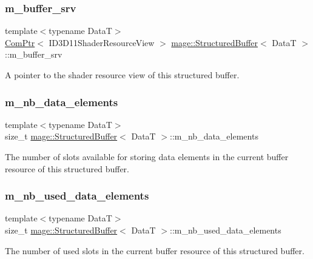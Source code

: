 \subsubsection{\texorpdfstring{m\+\_\+buffer\+\_\+srv}{m\_buffer\_srv}}
{\footnotesize\ttfamily template$<$typename DataT$>$ \\
\hyperlink{namespacemage_ae74f374780900893caa5555d1031fd79}{Com\+Ptr}$<$ I\+D3\+D11\+Shader\+Resource\+View $>$ \hyperlink{structmage_1_1_structured_buffer}{mage\+::\+Structured\+Buffer}$<$ DataT $>$\+::m\+\_\+buffer\+\_\+srv\hspace{0.3cm}{\ttfamily [private]}}

A pointer to the shader resource view of this structured buffer. \hypertarget{structmage_1_1_structured_buffer_a92c53203287f6ef5ab8ed88c7b588e72}{}\label{structmage_1_1_structured_buffer_a92c53203287f6ef5ab8ed88c7b588e72} 
\subsubsection{\texorpdfstring{m\+\_\+nb\+\_\+data\+\_\+elements}{m\_nb\_data\_elements}}
{\footnotesize\ttfamily template$<$typename DataT$>$ \\
size\+\_\+t \hyperlink{structmage_1_1_structured_buffer}{mage\+::\+Structured\+Buffer}$<$ DataT $>$\+::m\+\_\+nb\+\_\+data\+\_\+elements\hspace{0.3cm}{\ttfamily [private]}}

The number of slots available for storing data elements in the current buffer resource of this structured buffer. \hypertarget{structmage_1_1_structured_buffer_a8c69058d2ce956c7c1690a45e1bffb34}{}\label{structmage_1_1_structured_buffer_a8c69058d2ce956c7c1690a45e1bffb34} 
\subsubsection{\texorpdfstring{m\+\_\+nb\+\_\+used\+\_\+data\+\_\+elements}{m\_nb\_used\_data\_elements}}
{\footnotesize\ttfamily template$<$typename DataT$>$ \\
size\+\_\+t \hyperlink{structmage_1_1_structured_buffer}{mage\+::\+Structured\+Buffer}$<$ DataT $>$\+::m\+\_\+nb\+\_\+used\+\_\+data\+\_\+elements\hspace{0.3cm}{\ttfamily [private]}}

The number of used slots in the current buffer resource of this structured buffer. 